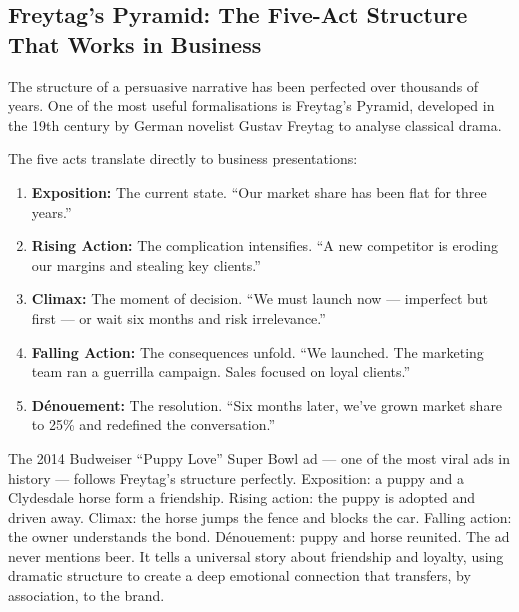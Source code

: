 \subsection{Freytag's Pyramid: The Five-Act Structure That Works in Business}

The structure of a persuasive narrative has been perfected over thousands of years. One of the most useful formalisations is Freytag's Pyramid, developed in the 19th century by German novelist Gustav Freytag to analyse classical drama.

The five acts translate directly to business presentations:

\begin{enumerate}
  \item \textbf{Exposition:} The current state. ``Our market share has been flat for three years.''
  \item \textbf{Rising Action:} The complication intensifies. ``A new competitor is eroding our margins and stealing key clients.''
  \item \textbf{Climax:} The moment of decision. ``We must launch now --- imperfect but first --- or wait six months and risk irrelevance.''
  \item \textbf{Falling Action:} The consequences unfold. ``We launched. The marketing team ran a guerrilla campaign. Sales focused on loyal clients.''
  \item \textbf{D\'enouement:} The resolution. ``Six months later, we've grown market share to 25\% and redefined the conversation.''
\end{enumerate}

\begin{insightbox}
The 2014 Budweiser ``Puppy Love'' Super Bowl ad --- one of the most viral ads in history --- follows Freytag's structure perfectly. Exposition: a puppy and a Clydesdale horse form a friendship. Rising action: the puppy is adopted and driven away. Climax: the horse jumps the fence and blocks the car. Falling action: the owner understands the bond. D\'enouement: puppy and horse reunited. The ad never mentions beer. It tells a universal story about friendship and loyalty, using dramatic structure to create a deep emotional connection that transfers, by association, to the brand.
\end{insightbox}


